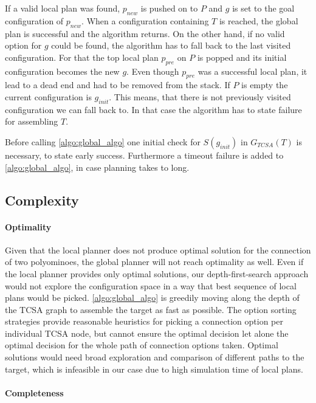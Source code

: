 If a valid local plan was found, $p_{new}$ is pushed on to $P$ and $g$ is set to the goal configuration of $p_{new}$.
When a configuration containing $T$ is reached, the global plan is successful and the algorithm returns.
On the other hand, if no valid option for $g$ could be found, the algorithm has to fall back to the last visited configuration.
For that the top local plan $p_{pre}$ on $P$ is popped and its initial configuration becomes the new $g$.
Even though $p_{pre}$ was a successful local plan, it lead to a dead end and had to be removed from the stack.
If $P$ is empty the current configuration is $g_{init}$.
This means, that there is not previously visited configuration we can fall back to.
In that case the algorithm has to state failure for assembling $T$.

Before calling \autoref{algo:global_algo} one initial check for $S(g_{init})$ in $G_{TCSA}(T)$ is necessary, to state early success.
Furthermore a timeout failure is added to \autoref{algo:global_algo}, in case planning takes to long.
 
\subsection{Complexity}

\paragraph{Optimality}

Given that the local planner does not produce optimal solution for the connection of two polyominoes, the global planner will not reach optimality as well.
Even if the local planner provides only optimal solutions, our depth-first-search approach would not explore the configuration space in a way that best sequence of local plans would be picked.
\autoref{algo:global_algo} is greedily moving along the depth of the TCSA graph to assemble the target as fast as possible.
The option sorting strategies provide reasonable heuristics for picking a connection option per individual TCSA node, but cannot ensure the optimal decision let alone the optimal decision for the whole path of connection options taken.
Optimal solutions would need broad exploration and comparison of different paths to the target, which is infeasible in our case due to high simulation time of local plans.

\paragraph{Completeness}

